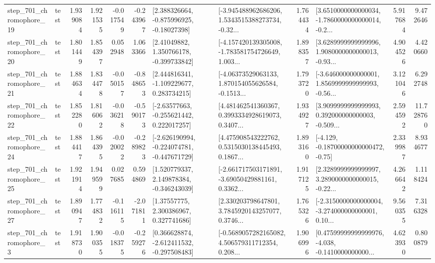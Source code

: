 \begin{tabular}{llrrrrllrlrr}
  step\_701\_chromophore\_19 &      test &      1.939084 &    1.921535 &     -0.017549 & -0.243967 &    [2.388326664, -0.875996925, -0.18027398] &  [-3.945488962686206, 1.5343515388273734, -0.32... &       1.764434 &  [3.6510000000000034, -1.7860000000000014, -0.2... &            5.917684 &          9.472646 \\
  step\_701\_chromophore\_20 &      test &      1.801449 &    1.854397 &      0.052948 &  1.063366 &     [2.41049882, 1.350766178, -0.399733842] &  [-4.157420139305008, -1.783581754726649, 1.003... &       1.898357 &  [3.6289999999999996, 1.9080000000000013, -0.93... &            4.904526 &          4.420660 \\
  step\_701\_chromophore\_21 &      test &      1.884634 &    1.834478 &     -0.050157 & -0.848653 &    [2.444816341, -1.109229677, 0.283734215] &  [-4.06373529063133, 1.870154055626584, -0.1513... &       1.793720 &  [-3.646000000000001, 1.8569999999999993, -0.56... &            3.121046 &          6.292748 \\
  step\_701\_chromophore\_22 &      test &      1.852280 &    1.816062 &     -0.036218 & -0.590173 &    [-2.63577663, -0.255621442, 0.222017257] &  [4.481462541360367, 0.3993334928619073, 0.3407... &       1.934927 &  [3.9099999999999993, 0.392000000000003, -0.509... &            2.594592 &         11.728760 \\
  step\_701\_chromophore\_24 &      test &      1.884417 &    1.864395 &     -0.020022 & -0.289823 &  [-2.626190994, -0.224074781, -0.447671729] &  [4.475908543222762, 0.5315030138445493, 0.1867... &       1.893160 &              [-4.129, -0.18700000000000472, -0.75] &            2.339987 &          8.934677 \\
  step\_701\_chromophore\_25 &      test &      1.921914 &    1.949599 &      0.027685 &  0.594869 &    [1.520779337, 2.149878384, -0.346243039] &  [-2.661717503171891, -3.69050429881161, 0.3362... &       1.917125 &  [2.3289999999999997, 3.2890000000000015, -0.22... &            4.266642 &          1.118424 \\
  step\_701\_chromophore\_27 &      test &      1.890947 &    1.774832 &     -0.116115 & -2.071811 &      [1.37557775, 2.300386967, 0.327741686] &  [2.330203798647801, 3.7845920143257077, 0.3746... &       1.765326 &  [-2.3150000000000004, -3.274000000000001, 0.10... &            9.560355 &          7.316328 \\
   step\_701\_chromophore\_3 &      test &      1.918730 &    1.900355 &     -0.018375 & -0.259276 &   [0.366628874, -2.612411532, -0.297508483] &  [-0.5689057282165082, 4.506579311712354, 0.208... &       1.906996 &  [0.47599999999999976, -4.038, -0.1410000000000... &            4.623930 &          0.800879 \\

\end{tabular}

